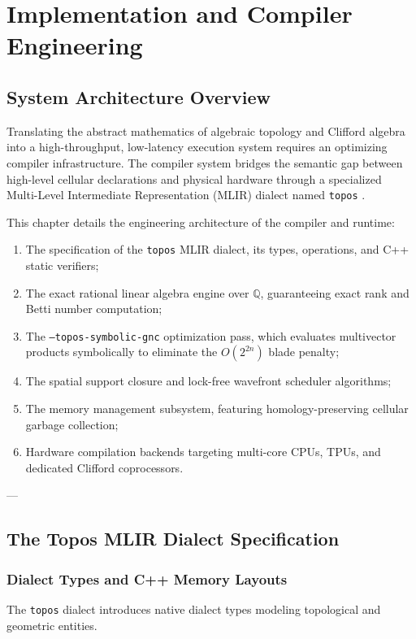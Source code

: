 \chapter{Implementation and Compiler Engineering}
\label{ch:implementation}

\section{System Architecture Overview}
\label{sec:system_arch_overview}

Translating the abstract mathematics of algebraic topology and Clifford algebra into a high-throughput, low-latency execution system requires an optimizing compiler infrastructure. The \ToposLang{} compiler system bridges the semantic gap between high-level cellular declarations and physical hardware through a specialized Multi-Level Intermediate Representation (MLIR) dialect named \texttt{topos} \cite{lattner2021mlir}.

This chapter details the engineering architecture of the \ToposLang{} compiler and runtime:
\begin{enumerate}[leftmargin=1.5cm]
    \item The specification of the \texttt{topos} MLIR dialect, its types, operations, and C++ static verifiers;
    \item The exact rational linear algebra engine over $\mathbb{Q}$, guaranteeing exact rank and Betti number computation;
    \item The \texttt{--topos-symbolic-gnc} optimization pass, which evaluates multivector products symbolically to eliminate the $O(2^{2n})$ blade penalty;
    \item The spatial support closure and lock-free wavefront scheduler algorithms;
    \item The memory management subsystem, featuring homology-preserving cellular garbage collection;
    \item Hardware compilation backends targeting multi-core CPUs, TPUs, and dedicated Clifford coprocessors.
\end{enumerate}

---

\section{The Topos MLIR Dialect Specification}
\label{sec:mlir_dialect}

\subsection{Dialect Types and C++ Memory Layouts}
The \texttt{topos} dialect introduces native dialect types modeling topological and geometric entities.

